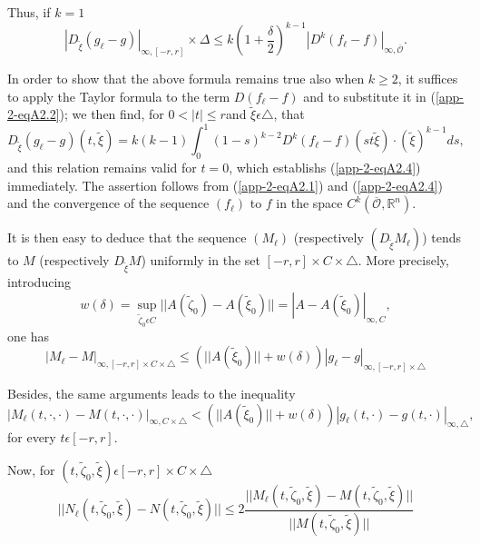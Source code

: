 Thus, if $k = 1$
\begin{equation*}
|D_{\widetilde{\xi}}(g_{\ell} - g)|_{\infty, [-r, r]} \times \Delta \leq k(1
+ \frac{\delta}{2})^{k-1} |D^{k}(f_{\ell}-f)|_{\infty,
  \overline{\mathscr{O}}}.\tag{A2.4} \label{app-2-eqA2.4}
\end{equation*}

In order to show that the above formula remains true also when $k \geq
2$, it suffices to apply the Taylor formula to the term $D(f_{\ell} -
f)$ and to substitute it in (\ref{app-2-eqA2.2}); we then find, for $0 < |t| \leq
r$\pageoriginale and $\widetilde{\xi} \epsilon \triangle$, that
$$
D_{\widetilde{\xi}}(g_{\ell}-g) (t, \widetilde{\xi}) = k(k-1)
\int_{0}^{1} (1-s)^{k-2} D^{k}(f_{\ell}-f) (st \widetilde{\xi}) \cdot
(\widetilde{\xi})^{k-1} ds,
$$
and this relation remains valid for $t = 0$, which establishs (\ref{app-2-eqA2.4})
immediately. The assertion follows from (\ref{app-2-eqA2.1}) and (\ref{app-2-eqA2.4}) and the
convergence of the sequence $(f_{\ell})$ to $f$ in the space
$C^{k}(\overline{\mathscr{O}}, \mathbb{R}^{n})$.

It is then easy to deduce that the sequence $(M_{\ell})$ (respectively\break
$(D_{\widetilde{\xi}} M_{\ell})$) tends to $M$ (respectively
$D_{\widetilde{\xi}}M$) uniformly in the set $[-r, r] \times C \times
\triangle$. More precisely, introducing
\begin{equation*}
w(\delta) = \sup_{\widetilde{\zeta}_0 \epsilon C}
||A(\widetilde{\zeta}_{0}) - A(\widetilde{\xi}_{0})|| = |A -
A(\widetilde{\xi}_{0})|_{\infty, C},\tag{A2.5}\label{app-2-eqA2.5}
\end{equation*}
one has
\begin{equation*}
|M_{\ell} - M|_{\infty, [-r, r] \times C \times \triangle} \leq
(||A(\widetilde{\xi}_{0})|| + w(\delta)) |g_{\ell} - g|_{\infty, [-r,
    r] \times \triangle}\tag{A2.6}\label{app-2-eqA2.6}
\end{equation*}

Besides, the same arguments leads to the inequality
\begin{equation*}
|M_{\ell} (t, \cdot , \cdot)-M(t, \cdot , \cdot)|_{\infty, C \times
  \triangle} < \left(||A(\widetilde{\xi}_{0})|| + w(\delta)\right)
|g_{\ell}(t, \cdot)-g(t, \cdot)|_{\infty, \triangle},\tag*{(A2.6)$'$}\label{app-2-eqA2.6'}
\end{equation*}
for every $t \epsilon [-r, r]$.

Now, for $(t, \widetilde{\zeta}_{0}, \widetilde{\xi}) \epsilon [-r, r]  
\times C \times \triangle$
$$ 
||N_{\ell}(t, \widetilde{\zeta}_{0}, \widetilde{\xi})-N(t,
\widetilde{\zeta}_{0}, \widetilde{\xi})|| \leq 2 \frac{||M_{\ell}(t,
  \widetilde{\zeta}_{0}, \widetilde{\xi}) -M(t, \widetilde{\zeta}_{0},
   \widetilde{\xi})||}{||M(t, \widetilde{\zeta}_{0}, \widetilde{\xi})||}
$$ 

